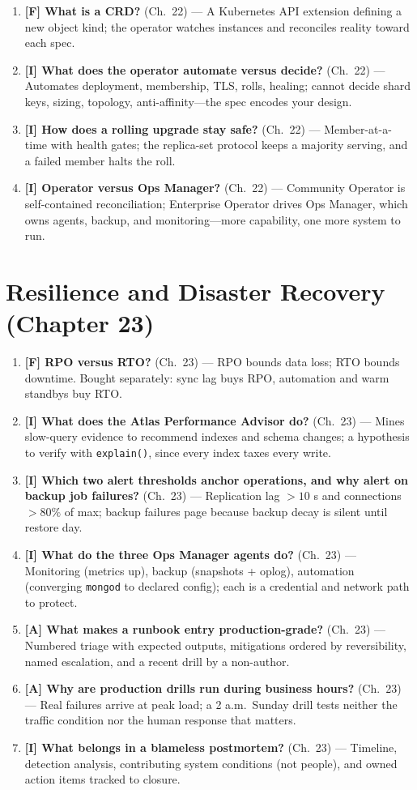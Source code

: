 \begin{enumerate}
    \item \textbf{[F] What is a CRD?} (Ch.~22) --- A Kubernetes API extension defining a new object kind; the operator watches instances and reconciles reality toward each spec.
    \item \textbf{[I] What does the operator automate versus decide?} (Ch.~22) --- Automates deployment, membership, TLS, rolls, healing; cannot decide shard keys, sizing, topology, anti-affinity---the spec encodes your design.
    \item \textbf{[I] How does a rolling upgrade stay safe?} (Ch.~22) --- Member-at-a-time with health gates; the replica-set protocol keeps a majority serving, and a failed member halts the roll.
    \item \textbf{[I] Operator versus Ops Manager?} (Ch.~22) --- Community Operator is self-contained reconciliation; Enterprise Operator drives Ops Manager, which owns agents, backup, and monitoring---more capability, one more system to run.
\end{enumerate}

\section{Resilience and Disaster Recovery (Chapter 23)}
\begin{enumerate}
    \item \textbf{[F] RPO versus RTO?} (Ch.~23) --- RPO bounds data loss; RTO bounds downtime. Bought separately: sync lag buys RPO, automation and warm standbys buy RTO.
    \item \textbf{[I] What does the Atlas Performance Advisor do?} (Ch.~23) --- Mines slow-query evidence to recommend indexes and schema changes; a hypothesis to verify with \texttt{explain()}, since every index taxes every write.
    \item \textbf{[I] Which two alert thresholds anchor operations, and why alert on backup job failures?} (Ch.~23) --- Replication lag $>10$ s and connections $>80\%$ of max; backup failures page because backup decay is silent until restore day.
    \item \textbf{[I] What do the three Ops Manager agents do?} (Ch.~23) --- Monitoring (metrics up), backup (snapshots + oplog), automation (converging \texttt{mongod} to declared config); each is a credential and network path to protect.
    \item \textbf{[A] What makes a runbook entry production-grade?} (Ch.~23) --- Numbered triage with expected outputs, mitigations ordered by reversibility, named escalation, and a recent drill by a non-author.
    \item \textbf{[A] Why are production drills run during business hours?} (Ch.~23) --- Real failures arrive at peak load; a 2 a.m.\ Sunday drill tests neither the traffic condition nor the human response that matters.
    \item \textbf{[I] What belongs in a blameless postmortem?} (Ch.~23) --- Timeline, detection analysis, contributing system conditions (not people), and owned action items tracked to closure.
\end{enumerate}

